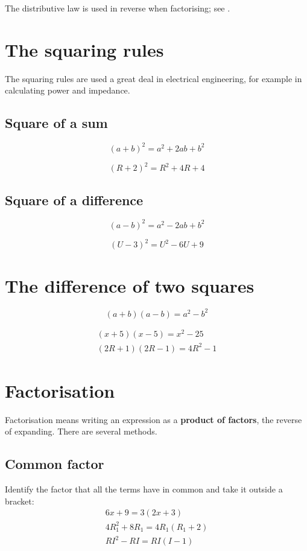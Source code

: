 The distributive law is used in reverse when factorising; see .

\section{The squaring rules}
\label{c2:sec:kvadrering}
The squaring rules are used a great deal in electrical engineering, for example in calculating
power and impedance.

\subsection{Square of a sum}
\label{c2:sec:kvsumma}
\[
  (a + b)^2 = a^2 + 2ab + b^2
\]

\begin{exempel}
\[
  (R + 2)^2 = R^2 + 4R + 4
\]
\end{exempel}

\subsection{Square of a difference}
\label{c2:sec:kvdiff}
\[
  (a - b)^2 = a^2 - 2ab + b^2
\]

\begin{exempel}
\[
  (U - 3)^2 = U^2 - 6U + 9
\]
\end{exempel}

\section{The difference of two squares}
\label{c2:sec:konjugat}
\[
  (a + b)(a - b) = a^2 - b^2
\]

\begin{exempel}
\begin{gather*}
  (x + 5)(x - 5) = x^2 - 25 \\
  (2R + 1)(2R - 1) = 4R^2 - 1
\end{gather*}
\end{exempel}

\section{Factorisation}
\label{c2:sec:faktorsattning}
Factorisation means writing an expression as a \textbf{product of factors}, the reverse of
expanding. There are several methods.

\subsection{Common factor}
\label{c2:sec:gemensam}
Identify the factor that all the terms have in common and take it outside a bracket:
\begin{gather*}
  6x + 9 = 3(2x + 3) \\
  4R_1^2 + 8R_1 = 4R_1(R_1 + 2) \\
  RI^2 - RI = RI(I - 1)
\end{gather*}

